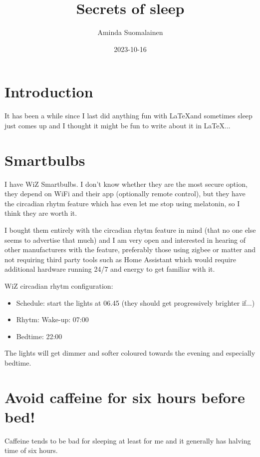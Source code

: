 \documentclass[a4paper]{boek3}
\title{Secrets of sleep}
\author{Aminda Suomalainen}
\date{2023-10-16}
\begin{document}
\maketitle
\tableofcontents

\chapter{Introduction}

It has been a while since I last did anything fun with \LaTeX and sometimes sleep just comes up and I thought it might be fun to write about it in \LaTeX...

\chapter{Smartbulbs}

I have WiZ Smartbulbs.
I don't know whether they are the most secure option, they depend on WiFi and their app (optionally remote control), but they have the circadian rhytm feature which has even let me stop using melatonin, so I think they are worth it.

I bought them entirely with the circadian rhytm feature in mind (that no one else seems to advertise that much) and I am very open and interested in hearing of other manufacturers with the feature, preferably those using zigbee or matter and not requiring third party tools such as Home Assistant which would require additional hardware running 24/7 and energy to get familiar with it.

WiZ circadian rhytm configuration:

\begin{itemize}
    \item Schedule: start the lights at 06.45 (they should get progressively brighter if...)
    \item Rhytm: Wake-up: 07:00
    \item Bedtime: 22:00
\end{itemize}


The lights will get dimmer and softer coloured towards the evening and especially bedtime.

\chapter{Avoid caffeine for six hours before bed!}

Caffeine tends to be bad for sleeping at least for me and it generally has halving time of six hours.
\end{document}
